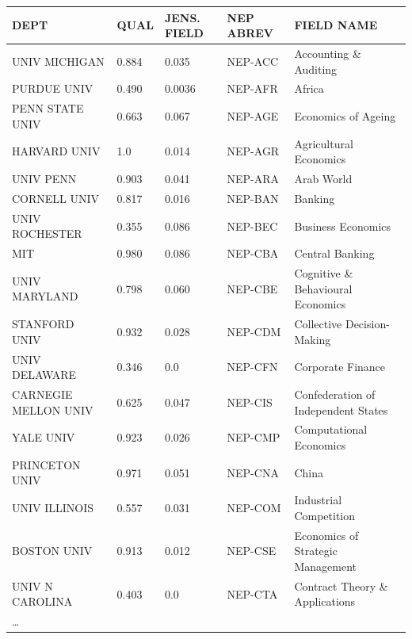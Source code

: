 \begin{table}
    \centering
    \begin{tabular}{lllll}
        DEPT                     & QUAL  & JENS. FIELD & NEP ABREV & FIELD NAME\\ \hline
        UNIV MICHIGAN            & 0.884 & 0.035       & NEP-ACC   & Accounting \& Auditing\\
        PURDUE UNIV              & 0.490 & 0.0036      & NEP-AFR   & Africa\\
        PENN STATE UNIV          & 0.663 & 0.067       & NEP-AGE   & Economics of Ageing\\
        HARVARD UNIV             & 1.0   & 0.014       & NEP-AGR   & Agricultural Economics\\
        UNIV PENN                & 0.903 & 0.041       & NEP-ARA   & Arab World\\
        CORNELL UNIV             & 0.817 & 0.016       & NEP-BAN   & Banking\\
        UNIV ROCHESTER           & 0.355 & 0.086       & NEP-BEC   & Business Economics\\
        MIT                      & 0.980 & 0.086       & NEP-CBA   & Central Banking\\
        UNIV MARYLAND            & 0.798 & 0.060       & NEP-CBE   & Cognitive \& Behavioural Economics\\
        STANFORD UNIV            & 0.932 & 0.028       & NEP-CDM   & Collective Decision-Making\\
        UNIV DELAWARE            & 0.346 & 0.0         & NEP-CFN   & Corporate Finance\\
        CARNEGIE MELLON UNIV     & 0.625 & 0.047       & NEP-CIS   & Confederation of Independent States\\
        YALE UNIV                & 0.923 & 0.026       & NEP-CMP   & Computational Economics\\
        PRINCETON UNIV           & 0.971 & 0.051       & NEP-CNA   & China\\
        UNIV ILLINOIS            & 0.557 & 0.031       & NEP-COM   & Industrial Competition\\
        BOSTON UNIV              & 0.913 & 0.012       & NEP-CSE   & Economics of Strategic Management\\
        UNIV N CAROLINA          & 0.403 & 0.0         & NEP-CTA   & Contract Theory \& Applications\\
        \ldots                   &       &             &           &\\

\end{tabular}
\end{table}
